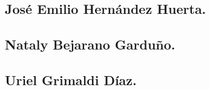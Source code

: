 \documentclass[10pt]{article}
\begin{document}
\begin{multicols}{2}
\subsection*{José Emilio Hernández Huerta.}
\subsection*{Nataly Bejarano Garduño.}
\subsection*{Uriel Grimaldi Díaz.}

\end{multicols}
\newpage
\clearpage
\begin{thebibliography}{0}
\end{thebibliography}
\end{document}
